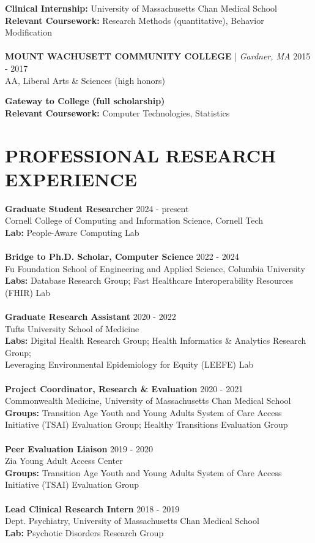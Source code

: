 \documentclass[a4paper,12pt]{article}
\begin{document}
\small{\textbf{Clinical Internship:} University of Massachusetts Chan Medical School}\\
\small{\textbf{Relevant Coursework:} Research Methods (quantitative), Behavior Modification}\\
\\
\textbf{MOUNT WACHUSETT COMMUNITY COLLEGE} | \textit{Gardner, MA} \hfill 2015 - 2017\\
AA, Liberal Arts \& Sciences (high honors) \\
\small{\textbf{Gateway to College (full scholarship)}\\
\small{\textbf{Relevant Coursework:} Computer Technologies, Statistics}\\

\section*{PROFESSIONAL RESEARCH EXPERIENCE}
\textbf{Graduate Student Researcher} \hfill 2024 - present\\
Cornell College of Computing and Information Science, Cornell Tech \\
\textbf{Lab:} People-Aware Computing Lab \\
\\
\textbf{Bridge to Ph.D. Scholar, Computer Science} \hfill 2022 - 2024\\
Fu Foundation School of Engineering and Applied Science, Columbia University \\
\textbf{Labs:} Database Research Group; Fast Healthcare Interoperability Resources (FHIR) Lab \\
\pagebreak 
\\
\textbf{Graduate Research Assistant} \hfill 2020 - 2022\\
Tufts University School of Medicine \\
\textbf{Labs:} Digital Health Research Group; Health Informatics \& Analytics Research Group; \\Leveraging Environmental Epidemiology for Equity (LEEFE) Lab \\
\\
\textbf{Project Coordinator, Research \& Evaluation} \hfill 2020 - 2021\\
Commonwealth Medicine, University of Massachusetts Chan Medical School \\
\textbf{Groups:} Transition Age Youth and Young Adults System of Care Access Initiative (TSAI) Evaluation Group; Healthy Transitions Evaluation Group \\
\\
\textbf{Peer Evaluation Liaison} \hfill 2019 - 2020\\
Zia Young Adult Access Center \\
\textbf{Groups:} Transition Age Youth and Young Adults System of Care Access Initiative (TSAI) Evaluation Group \\
\\
\textbf{Lead Clinical Research Intern} \hfill 2018 - 2019\\
Dept. Psychiatry, University of Massachusetts Chan Medical School \\
\textbf{Lab:} Psychotic Disorders Research Group \
}
\end{document}
